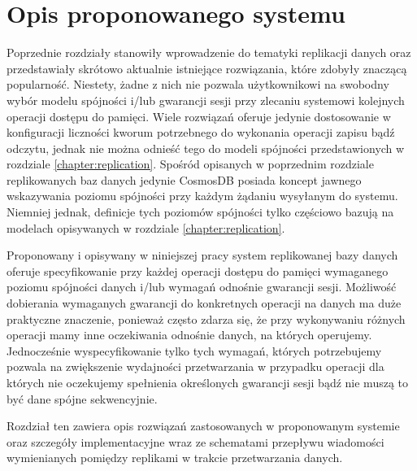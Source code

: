 \chapter{Opis proponowanego systemu} \label{chapter:systemdescription}


Poprzednie rozdziały stanowiły wprowadzenie do tematyki replikacji danych oraz przedstawiały skrótowo aktualnie istniejące rozwiązania, które zdobyły znaczącą popularność. Niestety, żadne z nich nie pozwala użytkownikowi na swobodny wybór modelu spójności i/lub gwarancji sesji przy zlecaniu systemowi kolejnych operacji dostępu do pamięci. Wiele rozwiązań oferuje jedynie dostosowanie w konfiguracji liczności kworum potrzebnego do wykonania operacji zapisu bądź odczytu, jednak nie można odnieść tego do modeli spójności przedstawionych w rozdziale \ref{chapter:replication}. Spośród opisanych w poprzednim rozdziale replikowanych baz danych jedynie CosmosDB posiada koncept jawnego wskazywania poziomu spójności przy każdym żądaniu wysyłanym do systemu. Niemniej jednak, definicje tych poziomów spójności tylko częściowo bazują na modelach opisywanych w rozdziale \ref{chapter:replication}.

Proponowany i opisywany w niniejszej pracy system replikowanej bazy danych oferuje specyfikowanie przy każdej operacji dostępu do pamięci wymaganego poziomu spójności danych i/lub wymagań odnośnie gwarancji sesji. Możliwość dobierania wymaganych gwarancji do konkretnych operacji na danych ma duże praktyczne znaczenie, ponieważ często zdarza się, że przy wykonywaniu różnych operacji mamy inne oczekiwania odnośnie danych, na których operujemy. Jednocześnie wyspecyfikowanie tylko tych wymagań, których potrzebujemy pozwala na zwiększenie wydajności przetwarzania w przypadku operacji dla których nie oczekujemy spełnienia określonych gwarancji sesji bądź nie muszą to być dane spójne sekwencyjnie.

Rozdział ten zawiera opis rozwiązań zastosowanych w proponowanym systemie oraz szczegóły implementacyjne wraz ze schematami przepływu wiadomości wymienianych pomiędzy replikami w trakcie przetwarzania danych.


